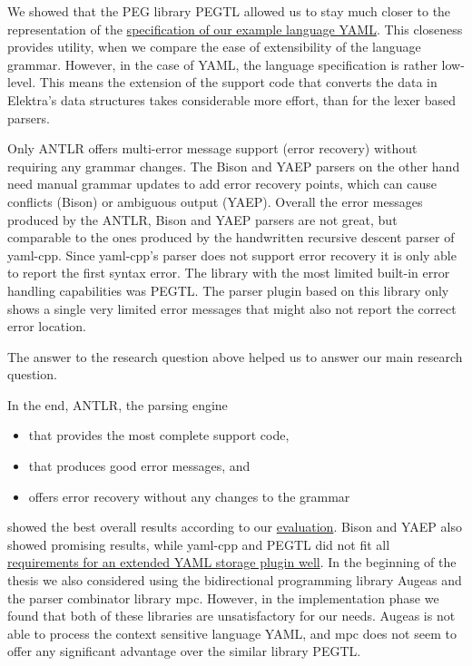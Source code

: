 \closeness*

We showed that the \gls{PEG} library \gls{PEGTL} allowed us to stay much closer to the representation of the \href{http://yaml.org/spec/1.2/spec.html}{specification of our example language YAML}. This closeness provides utility, when we compare the ease of extensibility of the language grammar. However, in the case of YAML, the language specification is rather low-level. This means the extension of the support code that converts the data in Elektra’s data structures takes considerable more effort, than for the lexer based parsers.

\message*

Only ANTLR offers multi-error message support (error recovery) without requiring any grammar changes. The Bison and YAEP parsers on the other hand need manual grammar updates to add error recovery points, which can cause conflicts (Bison) or ambiguous output (\gls{YAEP}). Overall the error messages produced by the ANTLR, Bison and YAEP parsers are not great, but comparable to the ones produced by the handwritten recursive descent parser of yaml-cpp. Since yaml-cpp’s parser does not support error recovery it is only able to report the first syntax error. The library with the most limited built-in error handling capabilities was \gls{PEGTL}. The parser plugin based on this library only shows a single very limited error messages that might also not report the correct error location.

The answer to the research question above helped us to answer our main research question.

\main*

In the end, \gls{ANTLR}, the parsing engine

\begin{itemize}
  \item that provides the most complete support code,
  \item that produces good error messages, and
  \item offers error recovery without any changes to the grammar
\end{itemize}

showed the best overall results according to our \hyperref[sec:evaluation]{evaluation}. Bison and \gls{YAEP} also showed promising results, while yaml-cpp and PEGTL did not fit all \hyperref[sec:requirements_extended_yaml_plugin]{requirements for an extended YAML storage plugin well}. In the beginning of the thesis we also considered using the bidirectional programming library Augeas and the parser combinator library mpc. However, in the implementation phase we found that both of these libraries are unsatisfactory for our needs. Augeas is not able to process the context sensitive language YAML, and mpc does not seem to offer any significant advantage over the similar library \gls{PEGTL}.

